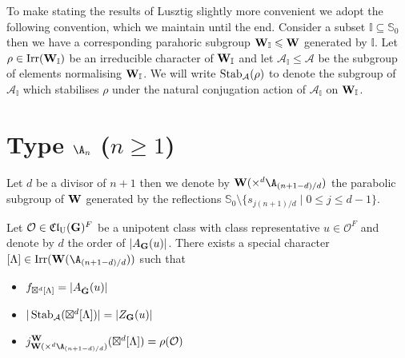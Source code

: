 \documentclass[eqthmnum]{jt-calcs}
\newcommand{\Clu}{\ensuremath{\mathfrak{Cl}_{\mathrm{U}}}}
\begin{document}
\begin{pa}
To make stating the results of Lusztig slightly more convenient we adopt the following convention, which we maintain until the end. Consider a subset $\mathbb{I} \subseteq \mathbb{S}_0$ then we have a corresponding parahoric subgroup $\mathbf{W}_{\mathbb{I}} \leqslant \mathbf{W}$ generated by $\mathbb{I}$. Let $\rho \in \operatorname{Irr}(\mathbf{W}_{\mathbb{I}})$ be an irreducible character of $\mathbf{W}_{\mathbb{I}}$ and let $\mathcal{A}_{\mathbb{I}} \leqslant \mathcal{A}$ be the subgroup of elements normalising $\mathbf{W}_{\mathbb{I}}$. We will write $\operatorname{Stab}_{\mathcal{A}}(\rho)$ to denote the subgroup of $\mathcal{A}_{\mathbb{I}}$ which stabilises $\rho$ under the natural conjugation action of $\mathcal{A}_{\mathbb{I}}$ on $\mathbf{W}_{\mathbb{I}}$.
\end{pa}

\section{\texorpdfstring{Type $\A_n$ ($n \geqslant 1$)}{Type A}}\label{sec:proof-prop:A-type-A}
\begin{pa}
Let $d$ be a divisor of $n+1$ then we denote by $\bW(\times^d{\A_{(n+1-d)/d}})$ the parabolic subgroup of $\mathbf{W}$ generated by the reflections $\mathbb{S}_0\setminus\{s_{j(n+1)/d} \mid 0 \leqslant j \leqslant d-1\}$.
\end{pa}

\begin{prop}\label{prop:lusztig-typeA}
Let $\mathcal{O} \in \Clu(\bG)^F$ be a unipotent class with class representative $u \in \mathcal{O}^F$ and denote by $d$ the order of $|A_{\mathbf{G}}(u)|$. There exists a special character $[\Lambda] \in \Irr(\bW(\A_{(n+1-d)/d}))$ such that
\begin{itemize}
	\item $f_{\boxtimes^d[\Lambda]} = |A_{\tilde{\mathbf{G}}}(u)|$
	\item $|\operatorname{Stab}_{\mathcal{A}}(\boxtimes^d [\Lambda])| = |Z_{\mathbf{G}}(u)|$
	\item $j_{\bW(\times^d\A_{(n+1-d)/d})}^{\bW}(\boxtimes^d[\Lambda]) = \rho(\mathcal{O})$
\end{itemize}
\end{prop}
\end{document}
